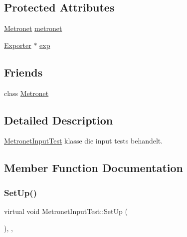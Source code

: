 \subsection*{Protected Attributes}
\begin{DoxyCompactItemize}
\item 
\hyperlink{class_metronet}{Metronet} \hyperlink{class_metronet_input_test_ab922ed7c2e4f1dfee1ed7df1eb3a13b4}{metronet}
\item 
\hyperlink{class_exporter}{Exporter} $\ast$ \hyperlink{class_metronet_input_test_ae16b3047e5801a34ef23dd9314e44770}{exp}
\end{DoxyCompactItemize}
\subsection*{Friends}
\begin{DoxyCompactItemize}
\item 
class \hyperlink{class_metronet_input_test_a07c94fb69880743e62f64a941fc2d4ab}{Metronet}
\end{DoxyCompactItemize}


\subsection{Detailed Description}
\hyperlink{class_metronet_input_test}{Metronet\+Input\+Test} klasse die input tests behandelt. 

\subsection{Member Function Documentation}
\mbox{\label{class_metronet_input_test_a863299908a545656568a7d534387e05d}} 
\subsubsection{\texorpdfstring{Set\+Up()}{SetUp()}}
{\footnotesize\ttfamily virtual void Metronet\+Input\+Test\+::\+Set\+Up (\begin{DoxyParamCaption}{ }\end{DoxyParamCaption})\hspace{0.3cm}{\ttfamily [inline]}, {\ttfamily [protected]}, {\ttfamily [virtual]}}

\mbox{\label{class_metronet_input_test_a20f35cb70be79eee36b1dab816cf6806}} 
